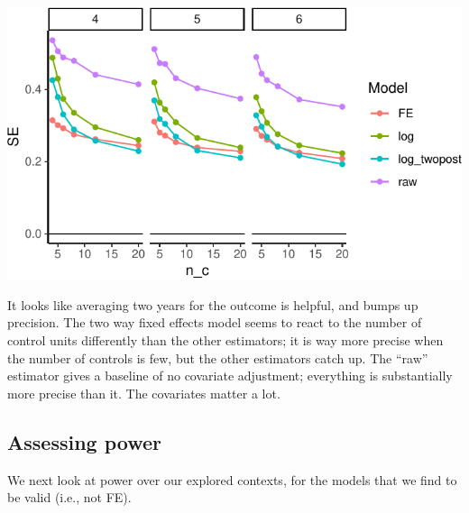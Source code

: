 \documentclass[
]{book}
\begin{document}
\begin{center}\includegraphics[width=0.75\linewidth]{Designing-Simulations-in-R_files/figure-latex/disc_precision-1} \end{center}

It looks like averaging two years for the outcome is helpful, and bumps up precision.
The two way fixed effects model seems to react to the number of control units differently than the other estimators; it is way more precise when the number of controls is few, but the other estimators catch up.
The ``raw'' estimator gives a baseline of no covariate adjustment; everything is substantially more precise than it.
The covariates matter a lot.

\subsection{Assessing power}\label{assessing-power}

We next look at power over our explored contexts, for the models that we find to be valid (i.e., not FE).
\end{document}
